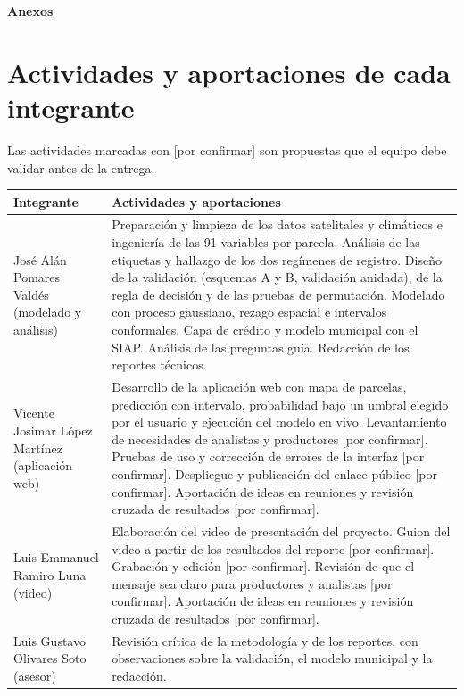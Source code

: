 \documentclass[10pt,letterpaper]{article}
\begin{document}
\begin{center}{\large\bfseries Anexos}\end{center}

\section{Actividades y aportaciones de cada integrante}
Las actividades marcadas con [por confirmar] son propuestas que el equipo debe validar antes de la entrega.

\small
\begin{tabularx}{\textwidth}{@{}>{\raggedright\arraybackslash}p{3.1cm}X@{}}
\toprule
Integrante & Actividades y aportaciones \\
\midrule
José Alán Pomares Valdés (modelado y análisis) &
Preparación y limpieza de los datos satelitales y climáticos e ingeniería de las 91 variables por parcela. Análisis de las etiquetas y hallazgo de los dos regímenes de registro. Diseño de la validación (esquemas A y B, validación anidada), de la regla de decisión y de las pruebas de permutación. Modelado con proceso gaussiano, rezago espacial e intervalos conformales. Capa de crédito y modelo municipal con el SIAP. Análisis de las preguntas guía. Redacción de los reportes técnicos. \\
\addlinespace
Vicente Josimar López Martínez (aplicación web) &
Desarrollo de la aplicación web con mapa de parcelas, predicción con intervalo, probabilidad bajo un umbral elegido por el usuario y ejecución del modelo en vivo. Levantamiento de necesidades de analistas y productores [por confirmar]. Pruebas de uso y corrección de errores de la interfaz [por confirmar]. Despliegue y publicación del enlace público [por confirmar]. Aportación de ideas en reuniones y revisión cruzada de resultados [por confirmar]. \\
\addlinespace
Luis Emmanuel Ramiro Luna (video) &
Elaboración del video de presentación del proyecto. Guion del video a partir de los resultados del reporte [por confirmar]. Grabación y edición [por confirmar]. Revisión de que el mensaje sea claro para productores y analistas [por confirmar]. Aportación de ideas en reuniones y revisión cruzada de resultados [por confirmar]. \\
\addlinespace
Luis Gustavo Olivares Soto (asesor) &
Revisión crítica de la metodología y de los reportes, con observaciones sobre la validación, el modelo municipal y la redacción. \\
\bottomrule
\end{tabularx}
\normalsize
\end{document}
